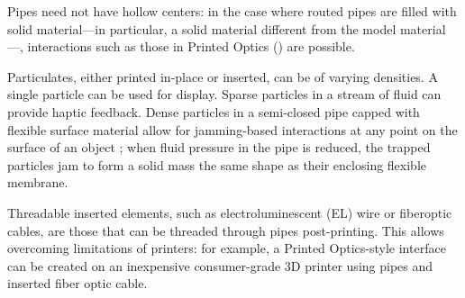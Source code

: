 Pipes need not have hollow centers: in the case where routed pipes are filled with solid material---in particular, a solid material different from the model material---, interactions such as those in Printed Optics (\cite{Willis-printedoptics}) are possible.

Particulates, either printed in-place or inserted, can be of varying densities.  A single particle can be used for display.  Sparse particles in a stream of fluid can provide haptic feedback.  Dense particles in a semi-closed pipe capped with flexible surface material allow for jamming-based interactions at any point on the surface of an object \cite{Follmer-jamming}; when fluid pressure in the pipe is reduced, the trapped particles jam to form a solid mass the same shape as their enclosing flexible membrane.

Threadable inserted elements, such as electroluminescent (EL) wire or fiberoptic cables, are those that can be threaded through pipes post-printing.  This allows overcoming limitations of printers: for example, a Printed Optics-style interface can be created on an inexpensive consumer-grade 3D printer using pipes and inserted fiber optic cable.